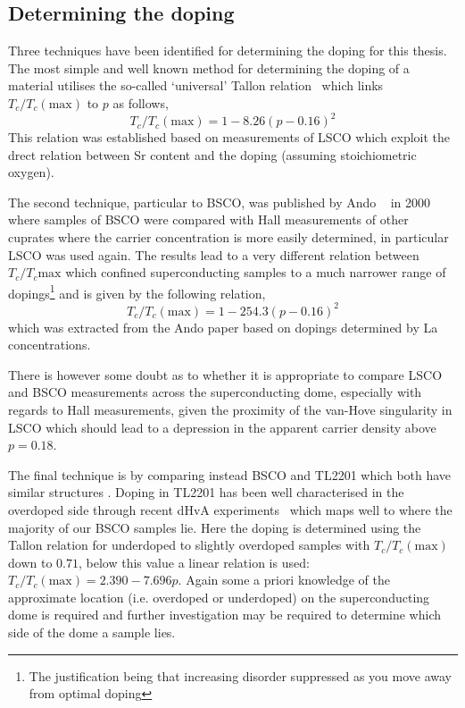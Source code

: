 \subsection{Determining the doping}

Three techniques have been identified for determining the doping for this thesis. The most simple and well known method for determining the doping of a material utilises the so-called `universal' Tallon relation~\cite{Presland1991} which links $T_c/T_c(\textrm{max})$ to $p$ as follows,
\begin{equation}
\label{Eqn:ExpH:TallonRelation}
T_c/T_c(\textrm{max}) = 1 - 8.26 (p - 0.16)^2
\end{equation}
This relation was established based on measurements of \acf{LSCO} which exploit the drect relation between Sr content and the doping (assuming stoichiometric oxygen).

The second technique, particular to \ac{BSCO}, was published by Ando \etal~\cite{Ando2000} in 2000 where samples of \ac{BSCO} were compared with Hall measurements of other cuprates where the carrier concentration is more easily determined, in particular \ac{LSCO} was used again. The results lead to a very different relation between $T_c/T_c{\textrm{max}}$ which confined superconducting samples to a much narrower range of dopings\footnote{The justification being that increasing disorder suppressed \Tc as you move away from optimal doping} and is given by the following relation,
\begin{equation}
\label{Eqn:Exp:AndoRelation}
T_c/T_c(\textrm{max}) = 1 - 254.3 (p - 0.16)^2
\end{equation}
which was extracted from the Ando paper based on dopings determined by La concentrations. 

There is however some doubt as to whether it is appropriate to compare \ac{LSCO} and \ac{BSCO} measurements across the superconducting dome, especially with regards to Hall measurements, given the proximity of the van-Hove singularity in \ac{LSCO} which should lead to a depression in the apparent carrier density above $p=0.18$.

The final technique is by comparing instead \ac{BSCO} and \ac{TL2201} which both have similar structures . Doping in \ac{TL2201} has been well characterised in the overdoped side through recent \ac{dHvA} experiments~\cite{Bangura2010} which maps well to where the majority of our \ac{BSCO} samples lie. Here the doping is determined using the Tallon relation for underdoped to slightly overdoped samples with $T_c/T_c(\textrm{max})$ down to $0.71$, below this value a linear relation is used: $T_c/T_c(\textrm{max}) = 2.390 - 7.696p$. Again some a priori knowledge of the approximate location (i.e. overdoped or underdoped) on the superconducting dome is required and further investigation may be required to determine which side of the dome a sample lies.

